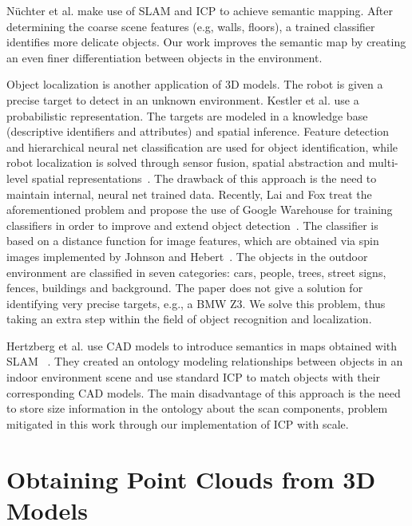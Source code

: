 \documentclass{llncs}
\begin{document}
N\"uchter et al. \cite{Nuchter:2008} make use of SLAM and ICP to
achieve semantic mapping. After determining the coarse scene features
(e.g, walls, floors), a trained classifier identifies more delicate
objects. Our work improves the semantic map by creating an even finer
differentiation between objects in the environment.

Object localization is another application of 3D models. The robot is
given a precise target to detect in an unknown environment. Kestler et
al. use a probabilistic representation. The targets are modeled in a
knowledge base (descriptive identifiers and attributes) and spatial
inference. Feature detection and hierarchical neural net
classification are used for object identification, while robot
localization is solved through sensor fusion, spatial abstraction and
multi-level spatial representations~\cite{Kestler:2000}. The drawback
of this approach is the need to maintain internal, neural net trained
data. Recently, Lai and Fox treat the aforementioned problem and
propose the use of Google Warehouse for training classifiers in order
to improve and extend object detection~\cite{Lai:2010}. The classifier
is based on a distance function for image features, which are obtained
via spin images implemented by Johnson and
Hebert~\cite{Hebert:1999}. The objects in the outdoor environment are
classified in seven categories: cars, people, trees, street signs, fences,
buildings and background. The paper does not give a solution for
identifying very precise targets, e.g., a BMW Z3. We solve this
problem, thus taking an extra step within the field of object
recognition and localization.

Hertzberg et al. use CAD models to introduce semantics in maps obtained with SLAM ~\cite{Hertzberg:2011}. They created an ontology modeling relationships between objects in an indoor environment scene and use standard ICP to match objects with their corresponding CAD models. The main disadvantage of this approach is the need to store size information in the ontology about the scan components, problem mitigated in this work through our implementation of ICP with scale.

\section{Obtaining Point Clouds from 3D Models}
\end{document}
